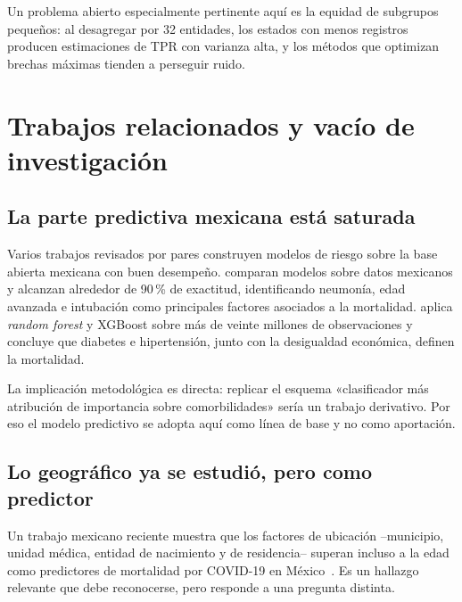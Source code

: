Un problema abierto especialmente pertinente aquí es la equidad de subgrupos
pequeños: al desagregar por 32 entidades, los estados con menos registros
producen estimaciones de TPR con varianza alta, y los métodos que optimizan
brechas máximas tienden a perseguir ruido.

\section{Trabajos relacionados y vacío de investigación}

\subsection{La parte predictiva mexicana está saturada}

Varios trabajos revisados por pares construyen modelos de riesgo sobre la base
abierta mexicana con buen desempeño. \textcite{becerra2022} comparan modelos sobre datos mexicanos y alcanzan
alrededor de 90\,\% de exactitud, identificando neumonía, edad avanzada e
intubación como principales factores asociados a la mortalidad.
\textcite{mendez2024} aplica \emph{random forest} y XGBoost sobre
más de veinte millones de observaciones y concluye que diabetes e hipertensión,
junto con la desigualdad económica, definen la mortalidad.

La implicación metodológica es directa: replicar el esquema «clasificador más
atribución de importancia sobre comorbilidades» sería un trabajo derivativo. Por
eso el modelo predictivo se adopta aquí como línea de base y no como aportación.


\subsection{Lo geográfico ya se estudió, pero como predictor}

Un trabajo mexicano reciente muestra que los factores de ubicación --municipio,
unidad médica, entidad de nacimiento y de residencia-- superan incluso a la edad
como predictores de mortalidad por COVID-19 en México~\parencite{geograficos2024}. Es
un hallazgo relevante que debe reconocerse, pero responde a una pregunta
distinta.

